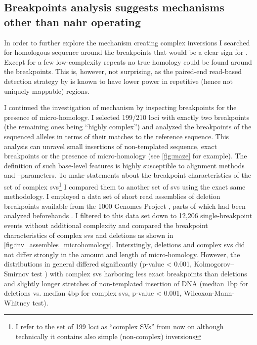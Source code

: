 \subsection{Breakpoints analysis suggests mechanisms other than \texorpdfstring{\acs{nahr}}{NAHR} operating}

In order to further explore the mechanism creating complex inversions I searched
for homologous sequence around the breakpoints that would be a clear sign for
\nahr. Except for a few low-complexity repeats no true homology could be found
around the breakpoints. This is, however, not surprising, as the paired-end
read-based detection strategy by \delly is known to have lower power in
repetitive (hence not uniquely mappable) regions.

I continued the investigation of mechanism by inspecting breakpoints for the
presence of micro-homology. I selected 199/210 loci with exactly two breakpoints
(the remaining ones being ``highly complex'') and analyzed the breakpoints of
the sequenced alleles in terms of their matches to the reference sequence. This
analysis can unravel small insertions of non-templated sequence, exact
breakpoints or the presence of micro-homology (see \cref{fig:maze} for example).
The definition of such base-level features is highly susceptible to alignment
methods and –parameters. To make statements about the breakpoint characteristics
of the set of complex \acp{sv}\footnote{I refer to the set of 199 loci as
``complex SVs'' from now on although technically it contains also simple
(non-complex) inversions} I compared them to another set of \acp{sv} using the
exact same methodology. I employed a data set of short read assemblies of
deletion breakpoints available from the 1000 Genomes Project \citep{Sudmant2015},
parts of which had been analyzed beforehands \citep{Abyzov2015}. I filtered to
this data set down to 12,206 single-breakpoint events without additional
complexity and compared the breakpoint characteristics of complex \acp{sv} and
deletions as shown in \cref{fig:inv_assembles_microhomology}. Interstingly,
deletions and complex \acp{sv} did not differ strongly in the amount and length
of micro-homology. However, the distributions in general differed significantly
(p-value < 0.001, Kolmogorov–Smirnov test ) with complex \acp{sv} harboring less
exact breakpoints than deletions and slightly longer stretches of non-templated
insertion of DNA (median 1bp for deletions vs. median 4bp for complex \acp{sv},
p-value < 0.001, Wilcoxon-Mann-Whitney test).

